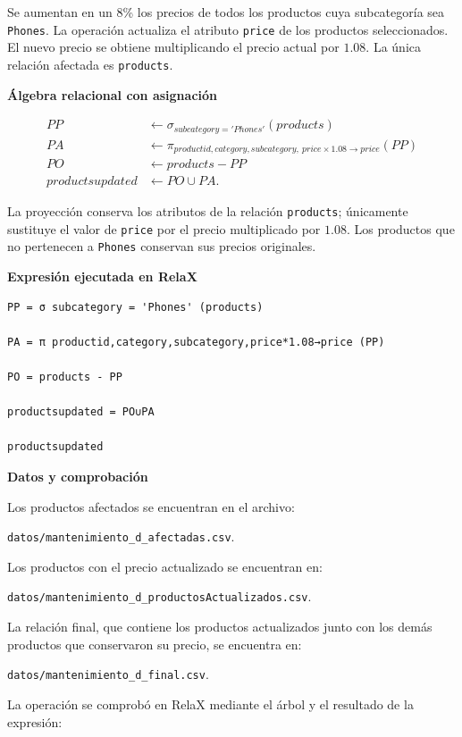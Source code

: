 
Se aumentan en un 8\% los precios de todos los productos cuya subcategoría sea \texttt{Phones}. La operación actualiza el atributo \texttt{price} de los productos seleccionados. El nuevo precio se obtiene multiplicando el precio actual por $1.08$. La única relación afectada es \texttt{products}.

\textbf{Álgebra relacional con asignación}

\begin{align*}
PP &\leftarrow \sigma_{subcategory='Phones'}(products)\\
PA &\leftarrow \pi_{productid,category,subcategory,\ price\times1.08\to price}(PP)\\
PO &\leftarrow products-PP\\
productsupdated &\leftarrow PO\cup PA.
\end{align*}

La proyección conserva los atributos de la relación \texttt{products}; únicamente sustituye el valor de \texttt{price} por el precio multiplicado por $1.08$. Los productos que no pertenecen a \texttt{Phones} conservan sus precios originales.

\textbf{Expresión ejecutada en RelaX}

\begin{lstlisting}
PP = σ subcategory = 'Phones' (products)

PA = π productid,category,subcategory,price*1.08→price (PP)

PO = products - PP

productsupdated = PO∪PA

productsupdated
\end{lstlisting}

\textbf{Datos y comprobación}

Los productos afectados se encuentran en el archivo:

\texttt{datos/mantenimiento\_d\_afectadas.csv}.

Los productos con el precio actualizado se encuentran en:

\texttt{datos/mantenimiento\_d\_productosActualizados.csv}.

La relación final, que contiene los productos actualizados junto con los demás productos que conservaron su precio, se encuentra en:

\texttt{datos/mantenimiento\_d\_final.csv}.

La operación se comprobó en RelaX mediante el árbol y el resultado de la expresión:

\begin{center}
\begin{minipage}{.48\linewidth}
\end{minipage}
\hfill
\begin{minipage}{.48\linewidth}
\end{minipage}
\end{center}